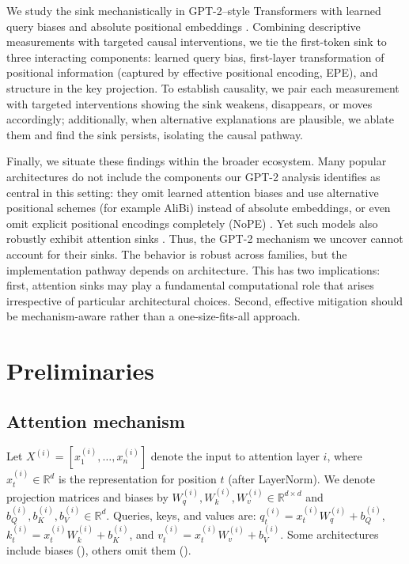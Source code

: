 \documentclass[11pt]{article}
\begin{document}
We study the sink mechanistically in GPT-2–style Transformers with learned query biases and absolute positional embeddings \citep{Radford2019Language}. Combining descriptive measurements with targeted causal interventions, we tie the first-token sink to three interacting components: learned query bias, first-layer transformation of positional information (captured by effective positional encoding, EPE), and structure in the key projection. To establish causality, we pair each measurement with targeted interventions showing the sink weakens, disappears, or moves accordingly; additionally, 
when alternative explanations are plausible, we ablate them and find the 
sink persists, isolating the causal pathway.

Finally, we situate these findings within the broader ecosystem. Many popular architectures do not include the components our GPT-2 analysis identifies as central in this setting: they omit learned attention biases and use alternative positional schemes (for example AliBi) instead of absolute embeddings, or even omit explicit positional encodings completely (NoPE) \citep{touvron2023llama2,Chowdhery2022PaLMSL,su2021roformer,press2021train,Irie2019LanguageMW}. Yet such models also robustly exhibit attention sinks \citep{gu2025when,xiao2023efficient}. Thus, the GPT-2 mechanism we uncover cannot account for their sinks. The behavior is robust across families, but the implementation pathway depends on architecture. This has two implications: first, attention sinks may play a fundamental computational role that arises irrespective of particular architectural choices. Second, effective mitigation should be mechanism-aware rather than a one-size-fits-all approach.

\section{Preliminaries}
\subsection{Attention mechanism}
Let $X^{(i)}=[x_1^{(i)},\ldots,x_n^{(i)}]$ denote the input to attention layer $i$, where $x_t^{(i)}\in\mathbb{R}^{d}$ is the representation for position $t$ (after LayerNorm). We denote projection matrices and biases by $W_q^{(i)},W_k^{(i)},W_v^{(i)}\in\mathbb{R}^{d\times d}$ and $b_Q^{(i)},b_K^{(i)},b_V^{(i)}\in\mathbb{R}^{d}$. Queries, keys, and values are: $q_t^{(i)}=x_t^{(i)}W_q^{(i)} + b_Q^{(i)}$, $k_t^{(i)}=x_t^{(i)}W_k^{(i)} + b_K^{(i)}$, and $v_t^{(i)}=x_t^{(i)}W_v^{(i)} + b_V^{(i)}$. Some architectures include biases (\citet{Zhang2022OPTOP, Yang2024Qwen2}), others omit them (\citet{touvron2023llama2, Dehghani2023ScalingVT, Chowdhery2022PaLMSL}).
\end{document}
